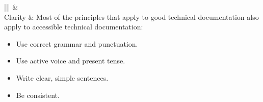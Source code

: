 \documentclass[letterpaper,10pt,english]{sphinxmanual}
\begin{document}
\begin{savenotes}\sphinxattablestart
\centering
\begin{tabular}[t]{|*{2}{|}}
\hline
{}\relax &\relax \\
\hline
Clarity
&
Most of the principles that apply to good technical documentation also apply to
accessible technical documentation:
\begin{itemize}
\item {} 
Use correct grammar and punctuation.

\item {} 
Use active voice and present tense.

\item {} 
Write clear, simple sentences.

\item {} 
Be consistent.


\end{itemize}
\end{tabular}
\end{savenotes}
\end{document}
